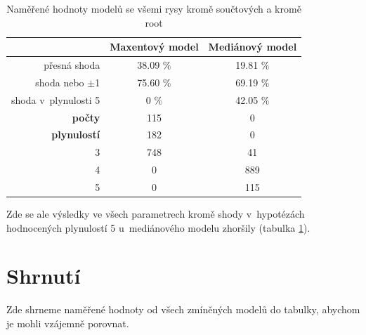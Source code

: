 \documentclass[12pt,a4paper]{report}
\begin{document}
\begin{table}[!htbp]
\begin{center}
\begin{tabular}{|r|c|c|}
\hline
 & \textbf{Maxentový model} & \textbf{Mediánový model} \\
 \hline
přesná shoda & 38.09 \%  & 19.81 \%  \\
\hline
shoda nebo $\pm$1 & 75.60 \% & 69.19 \%  \\
\hline
shoda v~plynulosti 5 & \color{red}0 \% & 42.05 \%   \\
\hline
     \textbf{počty} \quad 1 & 115   & \color{red} 0   \\
\textbf{plynulostí} \quad 2 & 182 & \color{red}0   \\
                          3 & 748 & 41 \\
                          4 & \color{red}0   & 889 \\
                          5 & \color{red}0   & 115  \\
\hline
\end{tabular}
\caption[Hodnoty modelů se všemi rysy kromě součtových a kromě root]{Naměřené hodnoty modelů se všemi rysy kromě součtových a kromě root}\label{tb:woutsumsroot}
\end{center}
\end{table}

Zde se ale výsledky ve všech parametrech kromě shody v~hypotézách hodnocených plynulostí 5 u~mediánového modelu zhoršily (tabulka \ref{tb:woutsumsroot}).


\section{Shrnutí}
Zde shrneme naměřené hodnoty od všech zmíněných modelů do tabulky, abychom je mohli vzájemně porovnat.
\end{document}
